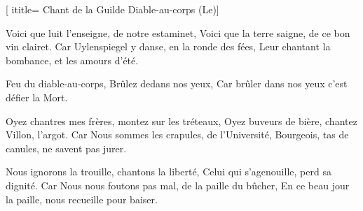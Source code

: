[
ititle= {Chant de la Guilde Diable-au-corps (Le)}]


\beginverse
Voici que luit l'enseigne, de notre estaminet,
Voici que la terre saigne, de ce bon vin clairet.
Car
Uylenspiegel y danse, en la ronde des fées,
Leur chantant la bombance, et les amours d'été.
\endverse

\beginchorus
Feu du diable-au-corps,
Brûlez dedans nos yeux,
Car brûler dans nos yeux
c'est défier la Mort.
\endchorus

\beginverse
Oyez chantres mes frères, montez sur les tréteaux,
Oyez buveurs de bière, chantez Villon, l'argot.
Car
Nous sommes les crapules, de l'Université,
Bourgeois, tas de canules, ne savent pas jurer.
\endverse

\beginverse
Nous ignorons la trouille, chantons la liberté,
Celui qui s'agenouille, perd sa dignité.
Car
Nous nous foutons pas mal, de la paille du bûcher,
En ce beau jour la paille, nous recueille pour baiser.
\endverse

\endsong